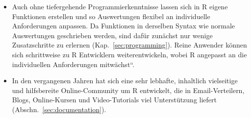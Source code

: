 \begin{itemize}
\item Auch ohne tiefergehende Programmierkenntnisse lassen sich in R eigene Funktionen erstellen und so Auswertungen flexibel an individuelle Anforderungen anpassen. Da Funktionen in derselben Syntax wie normale Auswertungen geschrieben werden, sind dafür zunächst nur wenige Zusatzschritte zu erlernen (Kap.\ \ref{sec:programming}). Reine Anwender können sich schrittweise zu R Entwicklern weiterentwickeln, wobei R angepasst an die individuellen Anforderungen {\quotedblbase}mitwächst{\textquotedblleft}.
\item In den vergangenen Jahren hat sich eine sehr lebhafte, inhaltlich vielseitige und hilfsbereite Online-Community um R entwickelt, die in Email-Verteilern, Blogs, Online-Kursen und Video-Tutorials viel Unterstützung liefert (Abschn.\ \ref{sec:documentation}).
\end{itemize}

